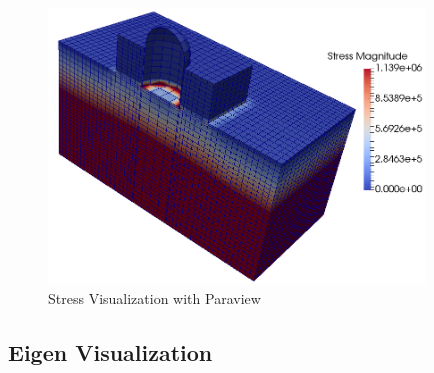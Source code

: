 \begin{figure}[H]
  \centering
  \includegraphics[width = 10cm]{./Figure-files/Day1/Postprocess_examples_with_Paraview/stress_visualization.png}
  \caption{Stress Visualization with Paraview}
  \label{fig_paraview_stress}
\end{figure}






\clearpage
\newpage
\subsection{Eigen Visualization}


